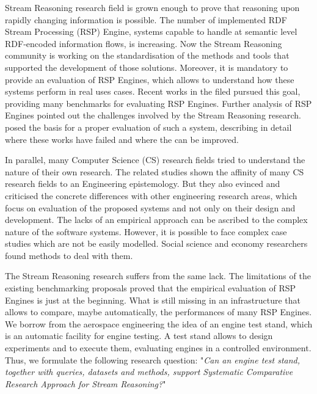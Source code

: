 Stream Reasoning research field is grown enough to prove that reasoning upon rapidly changing information is possible. The number of implemented RDF Stream Processing (RSP) Engine, systems capable to handle at semantic level RDF-encoded information flows, is increasing. Now the Stream Reasoning community is working on the standardisation of the methods and tools that supported the development of those solutions. Moreover, it is mandatory to provide an evaluation of RSP Engines, which allows to understand how these systems perform in real uses cases. 
Recent works in the filed \cite{Zhang2012, LePhuoc2012c, DBLP:conf/semweb/DellAglioCBCV13} pursued this goal, providing many benchmarks for evaluating RSP Engines. Further analysis of RSP Engines \cite{DBLP:conf/esws/ScharrenbachUMVB13} pointed out the challenges involved by the Stream Reasoning research. \cite{DBLP:conf/esws/ScharrenbachUMVB13} posed the basis for a proper evaluation of such a system, describing in detail where these works have failed and where the can be improved.

In parallel, many  Computer Science (CS) research fields tried to understand the nature of their own research. The related studies \cite{Tichy:1995:EEC:209090.209093, Wainer:2009:EEC:1518331.1518552} shown the affinity of many CS research fields to an Engineering epistemology. But they also evinced and criticised the concrete differences with other engineering research areas, which focus on evaluation of the proposed systems and not only on their design and development. The lacks of an empirical approach can be ascribed to the complex nature of the software systems. However, it is possible to face complex case studies which are not be easily modelled. Social science and economy researchers found methods to deal with them.

The Stream Reasoning research suffers from the same lack. The limitations of the existing benchmarking proposals proved that the empirical evaluation of RSP Engines is just at the beginning. What is still missing in an infrastructure that allows to compare, maybe automatically, the performances of many RSP Engines. We borrow from the aerospace engineering the idea of an engine test stand, which is an automatic facility for engine testing. A test stand allows to design experiments and to execute them, evaluating engines in a controlled environment. %
Thus, we formulate the following research question: "\textit{Can an engine test stand, together with queries, datasets and methods, support Systematic Comparative Research Approach for Stream Reasoning?}"

